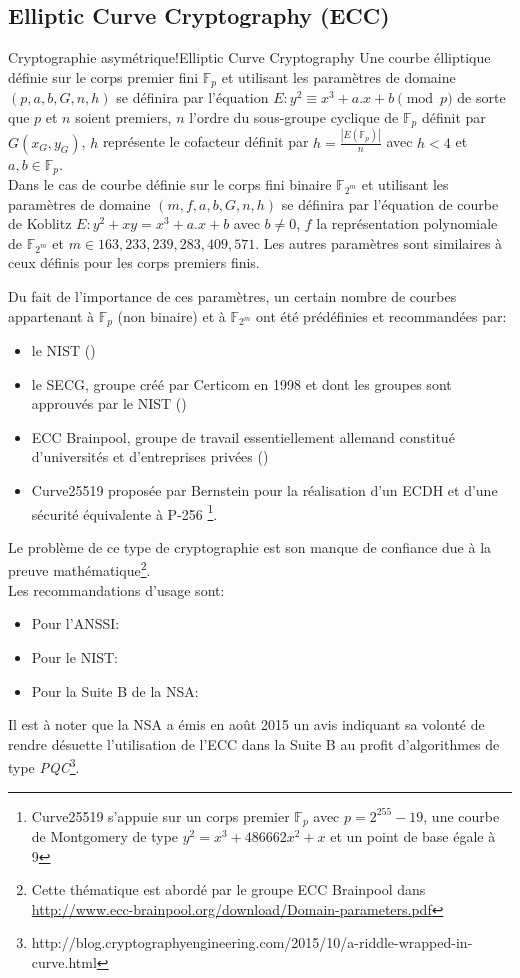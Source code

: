 \subsection{Elliptic Curve Cryptography (ECC)\label{ECC}}
\begin{Define}{Cryptographie asymétrique!Elliptic Curve Cryptography}
Une courbe élliptique définie sur le corps premier fini $\mathbb{F}_p$ et utilisant les paramètres de domaine $(p,a,b,G,n,h)$ se définira par l'équation $E: y^2 \equiv x^3 + a.x + b \pmod p$ de sorte que $p$ et $n$ soient premiers, $n$ l'ordre du sous-groupe cyclique de $\mathbb{F}_p$ définit par $G(x_G,y_G)$, $h$ représente le cofacteur définit par $h=\frac{|E(\mathbb{F}_p)|}{n}$ avec $h<4$ et $a,b \in \mathbb{F}_p$.\\
Dans le cas de courbe définie sur le corps fini binaire $\mathbb{F}_{2^m}$ et utilisant les paramètres de domaine $(m,f,a,b,G,n,h)$ se définira par l'équation de courbe de Koblitz $E: y^2 + xy = x^3 + a.x + b$ avec $b \ne 0$, $f$ la représentation polynomiale de $\mathbb{F}_{2^m}$ et $m \in {163, 233, 239, 283, 409, 571}$. Les autres paramètres sont similaires à ceux définis pour les corps premiers finis. 
\end{Define}
Du fait de l'importance de ces paramètres, un certain nombre de courbes appartenant à $\mathbb{F}_p$ (non binaire) et à $\mathbb{F}_{2^m}$ ont été prédéfinies et recommandées par:\begin{itemize}
\item le \gls{NIST} (\ECCNIST)
\item le \gls{SECG}, groupe créé par Certicom en 1998 et dont les groupes sont approuvés par le \gls{NIST} (\ECCSECG)
\item ECC Brainpool, groupe de travail essentiellement allemand constitué d'universités et d'entreprises privées (\ECCBP)
\item Curve25519 proposée par Bernstein pour la réalisation d'un ECDH et d'une sécurité équivalente à P-256 \footnote{Curve25519 s'appuie sur un corps premier $\mathbb{F}_p$ avec $p=2^{255}-19$, une courbe de Montgomery de type $y^2=x^3+486662x^2+x$ et un point de base égale à 9}.
\end{itemize}
Le problème de ce type de cryptographie est son manque de confiance due à la preuve mathématique\footnote{Cette thématique est abordé par le groupe ECC Brainpool dans \url{http://www.ecc-brainpool.org/download/Domain-parameters.pdf}}.\\
Les recommandations d'usage sont:\begin{itemize}
\item Pour l'\gls{ANSSI}: \ECDHrecosizeAnssi
\item Pour le \gls{NIST}: \ECDHrecosizeNIST
\item Pour la Suite B de la \gls{NSA}: \ECDHrecosizeCNSA
\end{itemize}
Il est à noter que la \gls{NSA} a émis en août 2015 un avis indiquant sa volonté de rendre désuette l'utilisation de l'\gls{ECC} dans la Suite B au profit d'algorithmes de type \textit{\gls{PQC}}\footnote{http://blog.cryptographyengineering.com/2015/10/a-riddle-wrapped-in-curve.html}.

